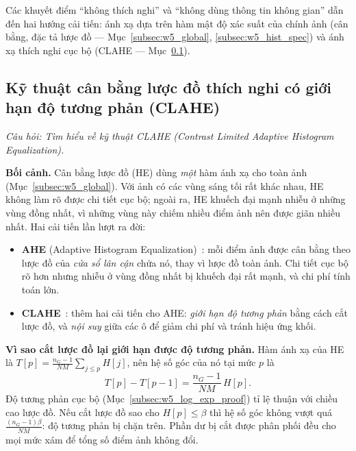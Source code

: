Các khuyết điểm ``không thích nghi'' và ``không dùng thông tin không gian'' dẫn đến hai hướng cải tiến: ánh xạ dựa trên hàm mật độ xác suất của chính ảnh (cân bằng, đặc tả lược đồ — Mục~\ref{subsec:w5_global}, \ref{subsec:w5_hist_spec}) và ánh xạ thích nghi cục bộ (CLAHE — Mục~\ref{subsec:w5_clahe}).

\subsection{Kỹ thuật cân bằng lược đồ thích nghi có giới hạn độ tương phản (CLAHE)}
\label{subsec:w5_clahe}

\textit{Câu hỏi: Tìm hiểu về kỹ thuật CLAHE (Contrast Limited Adaptive Histogram Equalization).}

\textbf{Bối cảnh.} Cân bằng lược đồ (HE) dùng \emph{một} hàm ánh xạ cho toàn ảnh (Mục~\ref{subsec:w5_global}). Với ảnh có các vùng sáng tối rất khác nhau, HE không làm rõ được chi tiết cục bộ; ngoài ra, HE khuếch đại mạnh nhiễu ở những vùng đồng nhất, vì những vùng này chiếm nhiều điểm ảnh nên được giãn nhiều nhất. Hai cải tiến lần lượt ra đời:
\begin{itemize}
    \item \textbf{AHE} (Adaptive Histogram Equalization)~\citep{pizer1987adaptive}: mỗi điểm ảnh được cân bằng theo lược đồ của \emph{cửa sổ lân cận} chứa nó, thay vì lược đồ toàn ảnh. Chi tiết cục bộ rõ hơn nhưng nhiễu ở vùng đồng nhất bị khuếch đại rất mạnh, và chi phí tính toán lớn.
    \item \textbf{CLAHE}~\citep{zuiderveld1994contrast}: thêm hai cải tiến cho AHE: \emph{giới hạn độ tương phản} bằng cách cắt lược đồ, và \emph{nội suy} giữa các ô để giảm chi phí và tránh hiệu ứng khối.
\end{itemize}

\textbf{Vì sao cắt lược đồ lại giới hạn được độ tương phản.} Hàm ánh xạ của HE là $T[p] = \frac{n_G - 1}{NM}\sum_{j \le p} H[j]$, nên hệ số góc của nó tại mức $p$ là
\begin{equation}
T[p] - T[p - 1] = \frac{n_G - 1}{NM}\,H[p].
\end{equation}
Độ tương phản cục bộ (Mục~\ref{subsec:w5_log_exp_proof}) tỉ lệ thuận với chiều cao lược đồ. Nếu cắt lược đồ sao cho $H[p] \le \beta$ thì hệ số góc không vượt quá $\frac{(n_G - 1)\beta}{NM}$: độ tương phản bị chặn trên. Phần dư bị cắt được phân phối đều cho mọi mức xám để tổng số điểm ảnh không đổi.

